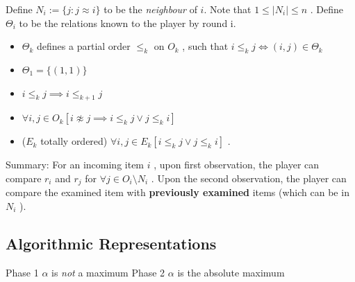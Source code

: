 Define $N_i := \{j: j \approx i\}$ to be the \textit{neighbour} of $i$. Note that $1\leq |N_i| \leq n$ .  
Define $\Theta_i$ to be the relations known to the player by round i. 
\begin{itemize}
	\item $\Theta_k$ defines a partial order $\le_{k}$ on $O_k$ , such that $i \le_{k} j \iff (i,j) \in \Theta_k$  
	\item $\Theta_1 = \{(1,1)\}$  
	\item $i \le_k j \implies i \le_{k+1} j$  
	\item $\forall i,j \in O_k[ i \not\approx j \implies i \le_k j \lor j \le_k i]$  
	\item ($E_k$ totally ordered) $\forall i,j \in E_k[i \le_k j \lor j \le_k i]$ .  
\end{itemize}
Summary: For an incoming item $i$ , upon first observation, the player can compare $r_i$ and $r_j$ for $\forall j \in O_i \setminus N_i$ . Upon the second observation, the player can compare the examined item with \textbf{previously examined} items (which can be in $N_i$ ).  


\subsection{Algorithmic Representations}


\begin{algorithm}[H]
\caption{Player's algorithm for the problem}
\label{algo1} 
\begin{algorithmic}[1]
	 \Comment Phase 1
		\Comment $\alpha$ is \emph{not} a maximum
		\Else 
		\EndIf
	\Comment Phase 2
		\Else				{} \Comment $\alpha$ is the absolute maximum
			\Else
			\EndIf
		\EndIf
	\Else
	\EndIf

\EndFor

\end{algorithmic}
\end{algorithm}




